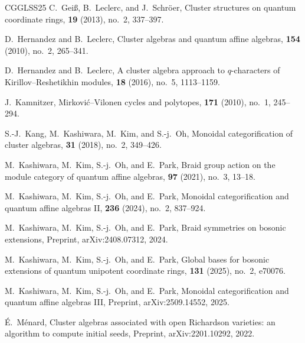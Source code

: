 \documentclass[12pt, reqno]{amsart}
\theoremstyle{plain}
\theoremstyle{definition}
\numberwithin{equation}{section}
\begin{document}
\begin{thebibliography}{CGGLSS25}
C.~Gei{\ss}, B.~Leclerc, and J.~Schr{\"o}er,
\newblock Cluster structures on quantum coordinate rings,
 \textbf{19} (2013), no.~2, 337--397.

D.~Hernandez and B.~Leclerc,
\newblock Cluster algebras and quantum affine algebras,
 \textbf{154} (2010), no.~2, 265--341.

D.~Hernandez and B.~Leclerc,
\newblock A cluster algebra approach to $q$-characters of Kirillov--Reshetikhin modules,
 \textbf{18} (2016), no.~5, 1113--1159.

J.~Kamnitzer,
\newblock Mirkovi\'c--Vilonen cycles and polytopes,
 \textbf{171} (2010), no.~1, 245--294.

S.-J.~Kang, M.~Kashiwara, M.~Kim, and S.-j.~Oh,
\newblock Monoidal categorification of cluster algebras,
 \textbf{31} (2018), no.~2, 349--426.

M.~Kashiwara, M.~Kim, S.-j.~Oh, and E.~Park,
\newblock Braid group action on the module category of quantum affine algebras,
 \textbf{97} (2021), no.~3, 13--18.

M.~Kashiwara, M.~Kim, S.-j.~Oh, and E.~Park,
\newblock Monoidal categorification and quantum affine algebras II,
 \textbf{236} (2024), no.~2, 837--924.

M.~Kashiwara, M.~Kim, S.-j.~Oh, and E.~Park,
\newblock Braid symmetries on bosonic extensions,
\newblock Preprint, arXiv:2408.07312, 2024.

M.~Kashiwara, M.~Kim, S.-j.~Oh, and E.~Park,
\newblock Global bases for bosonic extensions of quantum unipotent coordinate rings,
 \textbf{131} (2025), no.~2, e70076.

M.~Kashiwara, M.~Kim, S.-j.~Oh, and E.~Park,
\newblock Monoidal categorification and quantum affine algebras III,
\newblock Preprint, arXiv:2509.14552, 2025.

\'E.~M\'enard,
\newblock Cluster algebras associated with open Richardson varieties: an algorithm to compute initial seeds,
\newblock Preprint, arXiv:2201.10292, 2022.


\end{thebibliography}
\end{document}
